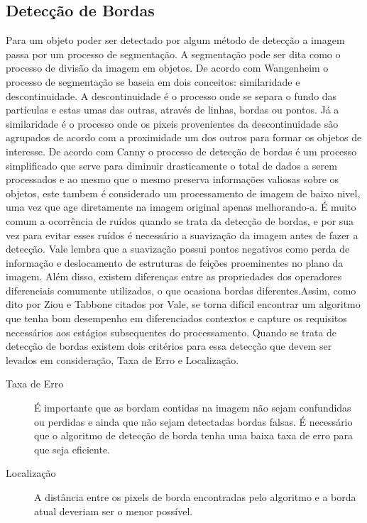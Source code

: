 \subsection{Detecção de Bordas}
Para um objeto poder ser detectado por algum método de detecção a imagem passa por um processo de segmentação. A segmentação pode ser dita como o processo de divisão da imagem em objetos\cite{Gonzalez:2008}. De acordo com Wangenheim\cite{Wangenheim:2014} o processo de segmentação se baseia em dois conceitos: similaridade e descontinuidade. A descontinuidade é o processo onde se separa o fundo das partículas e estas umas das outras, através de linhas, bordas ou pontos. Já a similaridade é o processo onde os pixeis provenientes da descontinuidade são agrupados de acordo com a proximidade um dos outros para formar os objetos de interesse. De acordo com Canny\cite{Canny:1986} o processo de detecção de bordas é um processo simplificado que serve para diminuir drasticamente o total de dados a serem processados e ao mesmo que o mesmo preserva informações valiosas sobre os objetos, este tambem é considerado um processamento de imagem de baixo nivel, uma vez que age diretamente na imagem original apenas melhorando-a. É muito comum a ocorrência de ruídos quando se trata da detecção de bordas, e por sua vez para evitar esses ruídos é necessário a suavização da imagem antes de fazer a detecção. Vale\cite{Vale:2002} lembra que a suavização possui pontos negativos como perda de informação e deslocamento de estruturas de feições proeminentes no plano da imagem. Além disso, existem diferenças entre as propriedades dos operadores diferenciais comumente utilizados, o que ocasiona  bordas diferentes.Assim, como dito por Ziou e Tabbone citados por Vale\cite{Vale:2002}, se torna difícil encontrar um algoritmo que tenha bom desempenho em diferenciados contextos e capture os requisitos necessários aos estágios subsequentes do processamento. 
Quando se trata de detecção de bordas existem dois critérios\cite{Canny:1986} para essa detecção que devem ser levados em consideração, Taxa de Erro e Localização\cite{Vale:2002}. 
\begin{description}
	\item[Taxa de Erro] É importante que as bordam contidas na imagem não sejam confundidas ou perdidas e ainda que não sejam detectadas bordas falsas. É necessário que o algoritmo de detecção de borda tenha uma baixa taxa de erro para que seja eficiente.\cite{Wangenheim:2014, Canny:1986, Vale:2002}
	\item[Localização] A distância entre os pixels de borda encontradas pelo algoritmo e a borda atual deveriam ser o menor possível.\cite{Wangenheim:2014}
\end{description}
